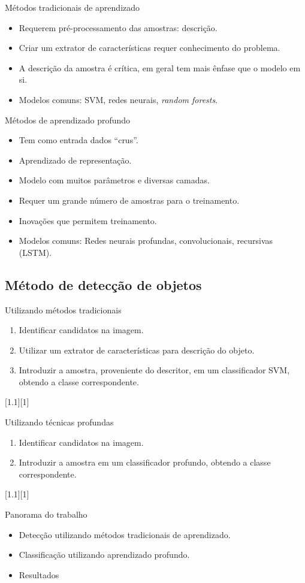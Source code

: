 	\begin{frame}{Métodos tradicionais de aprendizado}
		\begin{itemize}
			\item Requerem pré-processamento das amostras: descrição.
			\item Criar um extrator de características requer conhecimento do problema.
			\item A descrição da amostra é crítica, em geral tem mais ênfase que o modelo em si.
			\item Modelos comuns: SVM, redes neurais, \emph{random forests}.
		\end{itemize}
	\end{frame}
	
	\begin{frame}{Métodos de aprendizado profundo}
		\begin{itemize}
			\item Tem como entrada dados ``crus''.
			\item Aprendizado de representação.
			\item Modelo com muitos parâmetros e diversas camadas.
			\item Requer um grande número de amostras para o treinamento.
			\item Inovações que permitem treinamento.
			\item Modelos comuns: Redes neurais profundas, convolucionais, recursivas (LSTM).
		\end{itemize}
	\end{frame}

\subsection{Método de detecção de objetos}
	\begin{frame}{Utilizando métodos tradicionais}
	\begin{enumerate}
	\item Identificar candidatos na imagem.
	\item Utilizar um extrator de características para descrição do objeto.
	\item Introduzir a amostra, proveniente do descritor, em um classificador SVM, obtendo a classe correspondente.
	\end{enumerate}

	[1.1][1]
	\end{frame}

	\begin{frame}{Utilizando técnicas profundas}
	\begin{enumerate}
	\item Identificar candidatos na imagem.
	\item Introduzir a amostra em um classificador profundo, obtendo a classe correspondente.
	\end{enumerate}

	[1.1][1]
	\end{frame}

	\begin{frame}{Panorama do trabalho}
		\begin{itemize}
			\item Detecção utilizando métodos tradicionais de aprendizado.
			\item Classificação utilizando aprendizado profundo.
			\item Resultados
		\end{itemize}
	\end{frame}
